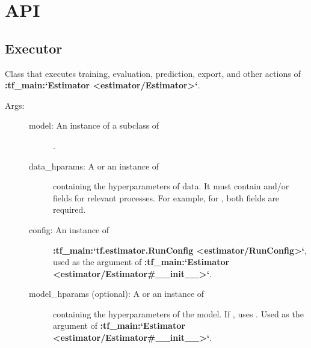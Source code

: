 \documentclass[letterpaper,10pt,english]{sphinxmanual}
\begin{document}
\chapter{API}
\label{\detokenize{index:module-shabda}}\label{\detokenize{index:api}}

\section{Executor}
\label{\detokenize{code/run:executor}}\label{\detokenize{code/run::doc}}

\begin{fulllineitems}
\label{\detokenize{code/run:shabda.run.Executor}}
Class that executes training, evaluation, prediction, export, and other
actions of {\color{red}\bfseries{}:tf\_main:{}`Estimator \textless{}estimator/Estimator\textgreater{}{}`}.
\begin{description}
\item[{Args:}] \leavevmode\begin{description}
\item[{model: An instance of a subclass of}] \leavevmode
{}.

\item[{data\_hparams: A  or an instance of }] \leavevmode
containing the hyperparameters of data. It must contain 
and/or  fields for relevant processes. For example, for
{\hyperref[\detokenize{code/run:shabda.run.Executor.train_and_evaluate}]{}}, both fields are required.

\item[{config: An instance of}] \leavevmode
{\color{red}\bfseries{}:tf\_main:{}`tf.estimator.RunConfig \textless{}estimator/RunConfig\textgreater{}{}`}, used as
the  argument of
{\color{red}\bfseries{}:tf\_main:{}`Estimator \textless{}estimator/Estimator\#\_\_init\_\_\textgreater{}{}`}.

\item[{model\_hparams (optional): A  or an instance of}] \leavevmode
{} containing the hyperparameters of
the model. If , uses . Used as
the  argument of
{\color{red}\bfseries{}:tf\_main:{}`Estimator \textless{}estimator/Estimator\#\_\_init\_\_\textgreater{}{}`}.


\end{description}
\end{description}
\end{fulllineitems}
\end{document}
